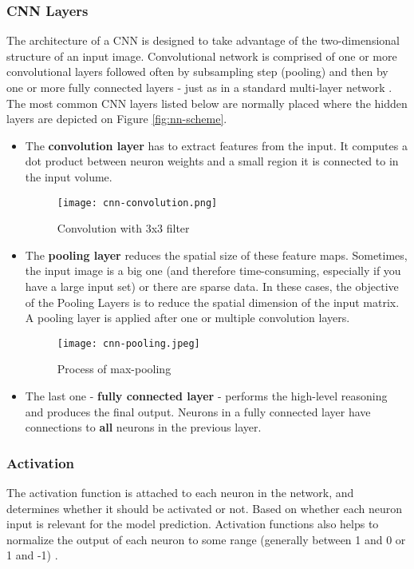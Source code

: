 \documentclass[../Main.tex]{subfiles}
\begin{document}
    \subsubsection{CNN Layers}
    The architecture of a CNN is designed to take advantage of the two-dimensional structure of an input image. Convolutional network is comprised of one or more convolutional layers followed often by subsampling step (pooling) and then by one or more fully connected layers - just as in a standard multi-layer network \cite{dlstanford}. The most common CNN layers listed below are normally placed where the hidden layers are depicted on Figure \ref{fig:nn-scheme}. 
    \begin{itemize}
        \item The \textbf{convolution layer} has to extract features from the input. It computes a dot product between neuron weights and a small region it is connected to in the input volume.
    \begin{figure}[ht!]
        \centering
        \texttt{[image: cnn-convolution.png]}
        \caption{Convolution with 3x3 filter \cite{dlstanford}}
        \label{fig:cnn-convolution}
    \end{figure}
    
        \item The \textbf{pooling layer} reduces the spatial size of these feature maps. Sometimes, the input image is a big one (and therefore time-consuming, especially if you have a large input set) or there are sparse data. In these cases, the objective of the Pooling Layers is to reduce the spatial dimension of the input matrix. A pooling layer is applied after one or multiple convolution layers.
    \begin{figure}[ht!]
        \centering
        \texttt{[image: cnn-pooling.jpeg]}
        \caption{Process of max-pooling \cite{dlstanford}}
        \label{fig:cnn-pooling}
    \end{figure}
    
        \item The last one - \textbf{fully connected layer} - performs the high-level reasoning and produces the final output. Neurons in a fully connected layer have connections to \textbf{all} neurons in the previous layer.
    \end{itemize}

    \subsubsection{Activation}
    The activation function is attached to each neuron in the network, and determines whether it should be activated or not. Based on whether each neuron input is relevant for the model prediction. Activation functions also helps to normalize the output of each neuron to some range (generally between 1 and 0 or 1 and -1) \cite{missinglink}. 
\end{document}
